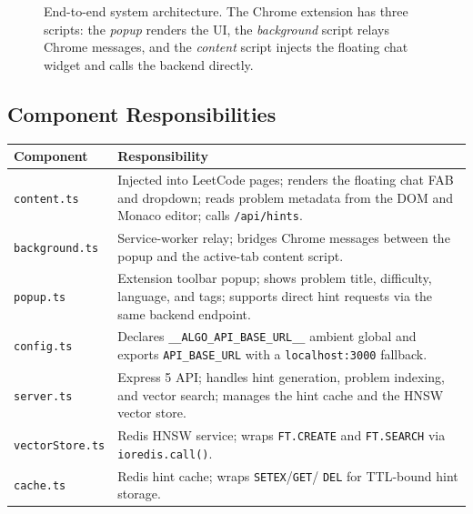 \documentclass[11pt,a4paper]{article}
\begin{document}
\begin{figure}[H]
\caption{End-to-end system architecture.  The Chrome extension has three
  scripts: the \emph{popup} renders the UI, the \emph{background} script relays
  Chrome messages, and the \emph{content} script injects the floating chat widget
  and calls the backend directly.}
\label{fig:arch}
\end{figure}

\subsection{Component Responsibilities}

\begin{center}
\begin{tabularx}{\linewidth}{lX}
  \toprule
  \textbf{Component} & \textbf{Responsibility} \\
  \midrule
  \texttt{content.ts}     & Injected into LeetCode pages; renders the floating
                            chat FAB and dropdown; reads problem metadata from the
                            DOM and Monaco editor; calls \texttt{/api/hints}. \\
  \texttt{background.ts}  & Service-worker relay; bridges Chrome messages between
                            the popup and the active-tab content script. \\
  \texttt{popup.ts}       & Extension toolbar popup; shows problem title,
                            difficulty, language, and tags; supports direct hint
                            requests via the same backend endpoint. \\
  \texttt{config.ts}      & Declares \texttt{\_\_ALGO\_API\_BASE\_URL\_\_} ambient
                            global and exports \texttt{API\_BASE\_URL} with a
                            \texttt{localhost:3000} fallback. \\
  \texttt{server.ts}      & Express 5 API; handles hint generation, problem
                            indexing, and vector search; manages the hint cache and
                            the HNSW vector store. \\
  \texttt{vectorStore.ts} & Redis HNSW service; wraps \texttt{FT.CREATE} and
                            \texttt{FT.SEARCH} via \texttt{ioredis.call()}. \\
  \texttt{cache.ts}       & Redis hint cache; wraps \texttt{SETEX}/\texttt{GET}/
                            \texttt{DEL} for TTL-bound hint storage. \\
  \bottomrule
\end{tabularx}
\end{center}
\end{document}
